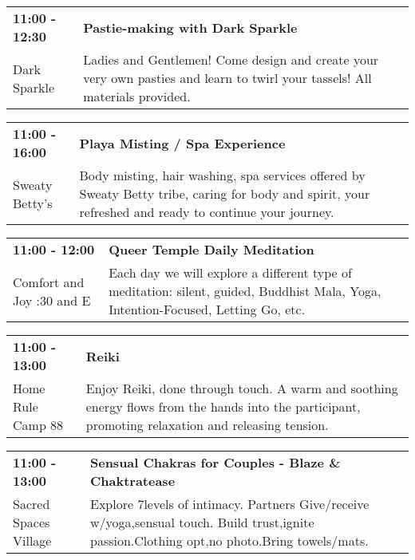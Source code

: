 \begin{tabular}{ p{1in} p{2.2in} }
    \textbf{11:00 - 12:30} & \textbf{Pastie-making with Dark Sparkle} \\
    Dark Sparkle \newline  & Ladies and Gentlemen! Come design and create your very own pasties and learn to twirl your tassels! All materials provided. \\
    \hline 
\end{tabular}
    
\begin{tabular}{ p{1in} p{2.2in} }
    \textbf{11:00 - 16:00} & \textbf{Playa Misting / Spa Experience} \\
    Sweaty  Betty's \newline  & Body misting, hair washing, spa services offered by Sweaty Betty tribe, caring for body and spirit, your refreshed and ready to continue your journey. \\
    \hline 
\end{tabular}
    
\begin{tabular}{ p{1in} p{2.2in} }
    \textbf{11:00 - 12:00} & \textbf{Queer Temple Daily Meditation} \\
    Comfort and Joy \newline 7:30 and E & Each day we will explore a different type of meditation: silent, guided, Buddhist Mala, Yoga, Intention-Focused, Letting Go, etc. \\
    \hline 
\end{tabular}
    
\begin{tabular}{ p{1in} p{2.2in} }
    \textbf{11:00 - 13:00} & \textbf{Reiki } \\
    Home Rule \newline Camp 88 & Enjoy Reiki, done through touch. A warm and soothing energy flows from the hands into the participant, promoting relaxation and releasing tension. \\
    \hline 
\end{tabular}
    
\begin{tabular}{ p{1in} p{2.2in} }
    \textbf{11:00 - 13:00} & \textbf{Sensual Chakras for Couples - Blaze \& Chaktratease} \\
    Sacred Spaces Village \newline  & Explore 7levels of intimacy. Partners Give/receive w/yoga,sensual touch. Build trust,ignite passion.Clothing opt,no photo.Bring towels/mats. \\
    \hline 
\end{tabular}
    
